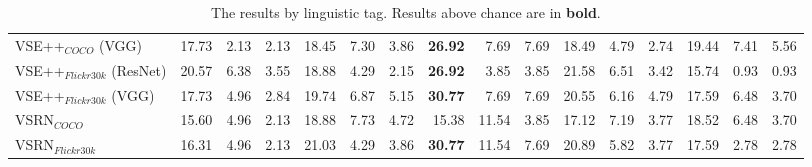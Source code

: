 \documentclass[10pt,twocolumn,letterpaper]{article}
\begin{document}
\begin{table*}[!ht]
{\begin{tabular}{lrrr|rrr|rrr|rrr|rrr}
 VSE++$_{COCO}$ (VGG)         & 17.73          & 2.13           & 2.13           & 18.45          & 7.30           & 3.86           & \textbf{26.92} & 7.69           & 7.69           & 18.49          & 4.79           & 2.74           & 19.44          & 7.41           & 5.56           \\
 VSE++$_{Flickr30k}$ (ResNet) & 20.57          & 6.38           & 3.55           & 18.88          & 4.29           & 2.15           & \textbf{26.92} & 3.85           & 3.85           & 21.58          & 6.51           & 3.42           & 15.74          & 0.93           & 0.93           \\
 VSE++$_{Flickr30k}$ (VGG)    & 17.73          & 4.96           & 2.84           & 19.74          & 6.87           & 5.15           & \textbf{30.77} & 7.69           & 7.69           & 20.55          & 6.16           & 4.79           & 17.59          & 6.48           & 3.70           \\
 VSRN$_{COCO}$                & 15.60          & 4.96           & 2.13           & 18.88          & 7.73           & 4.72           & 15.38          & 11.54          & 3.85           & 17.12          & 7.19           & 3.77           & 18.52          & 6.48           & 3.70           \\
 VSRN$_{Flickr30k}$           & 16.31          & 4.96           & 2.13           & 21.03          & 4.29           & 3.86           & \textbf{30.77} & 11.54          & 7.69           & 20.89          & 5.82           & 3.77           & 17.59          & 2.78           & 2.78           \\
          \bottomrule
  \end{tabular}
  }
  \caption{The results by linguistic tag. Results above chance are in \textbf{bold}.}
    \label{tab:results-by-ling-tag}
\end{table*}
\end{document}
